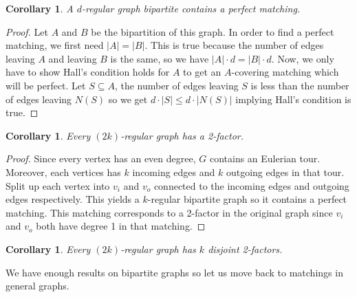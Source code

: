 \documentclass{tufte-handout}
\newtheorem{cor}[thm]{Corollary}
\theoremstyle{definition}
\theoremstyle{remark}
\begin{document}
\begin{cor}
	A $d$-regular graph bipartite contains a perfect matching.
\end{cor}
\begin{proof}
	Let $A$ and $B$ be the bipartition of this graph. In order to find a perfect matching, we first need $|A| = |B|$. This is true because the number of edges leaving $A$ and leaving $B$ is the same, so we have $|A|\cdot d = |B| \cdot d$. Now, we only have to show Hall's condition holds for $A$ to get an $A$-covering matching which will be perfect. Let $S \subseteq A$, the number of edges leaving $S$ is less than the number of edges leaving $N(S)$ so we get $d\cdot |S| \leq d \cdot |N(S)|$ implying Hall's condition is true. 
\end{proof}
\begin{cor}
	Every $(2k)$-regular graph has a 2-factor.
\end{cor}
\begin{proof}
	Since every vertex has an even degree, $G$ contains an Eulerian tour. Moreover, each vertices has $k$ incoming edges and $k$ outgoing edges in that tour. Split up each vertex into $v_i$ and $v_o$ connected to the incoming edges and outgoing edges respectively. This yields a $k$-regular bipartite graph so it contains a perfect matching. This matching corresponds to a 2-factor in the original graph since $v_i$ and $v_o$ both have degree 1 in that matching.
\end{proof}
\begin{cor}
	Every $(2k)$-regular graph has $k$ disjoint 2-factors.
\end{cor}
We have enough results on bipartite graphs so let us move back to matchings in general graphs.
\end{document}
